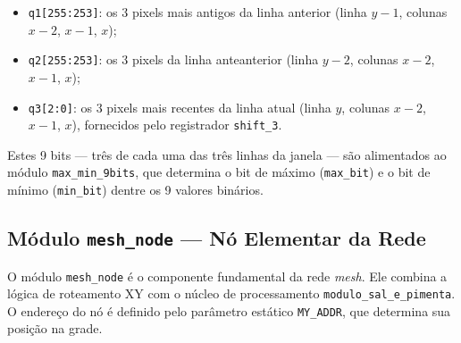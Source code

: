 \documentclass[12pt, a4paper]{article}
\begin{document}
	\begin{itemize}
		\item \texttt{q1[255:253]}: os 3 pixels mais antigos da linha anterior
		(linha $y-1$, colunas $x-2$, $x-1$, $x$);
		\item \texttt{q2[255:253]}: os 3 pixels da linha anteanterior (linha $y-2$,
		colunas $x-2$, $x-1$, $x$);
		\item \texttt{q3[2:0]}: os 3 pixels mais recentes da linha atual (linha
		$y$, colunas $x-2$, $x-1$, $x$), fornecidos pelo registrador
		\texttt{shift\_3}.
	\end{itemize}
	
	Estes 9 bits --- três de cada uma das três linhas da janela --- são
	alimentados ao módulo \texttt{max\_min\_9bits}, que determina o bit de
	máximo (\texttt{max\_bit}) e o bit de mínimo (\texttt{min\_bit}) dentre os
	9 valores binários.
	
	\subsection{Módulo \texttt{mesh\_node} --- Nó Elementar da Rede}
	
	O módulo \texttt{mesh\_node} é o componente fundamental da rede
	\textit{mesh}. Ele combina a lógica de roteamento XY com o núcleo de
	processamento \texttt{modulo\_sal\_e\_pimenta}. O endereço do nó é definido
	pelo parâmetro estático \texttt{MY\_ADDR}, que determina sua posição na grade.
	
\end{document}
